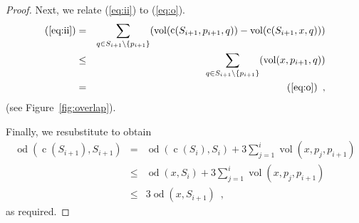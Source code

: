 \documentclass{article}
\DeclareMathOperator{\od}{od}
\DeclareMathOperator{\vol}{vol}
\DeclareMathOperator{\cog}{c}
\begin{document}
\begin{proof}
Next, we relate (\ref{eq:ii}) to (\ref{eq:o}).
\begin{eqnarray*}
 (\ref{eq:ii})  
     &=&  \sum_{q\in S_{i+1}\setminus \{p_{i+1}\}}
          (\vol(\cog(S_{i+1},p_{i+1},q)) - \vol(\cog(S_{i+1},x,q))) \\
     &\le &  \sum_{q\in S_{i+1}\setminus \{p_{i+1}\}} (\vol(x,p_{i+1},q)) \\
     & = &  (\ref{eq:o}) \enspace ,
\end{eqnarray*}
(see Figure~\ref{fig:overlap}).

Finally, we resubstitute to obtain
\begin{eqnarray*}
\od(\cog(S_{i+1}),S_{i+1}) 
  & = & \od(\cog(S_{i}),S_{i}) + 3 \sum_{j=1}^i \vol(x,p_j,p_{i+1}) \\
  &\le& \od(x,S_{i}) + 3 \sum_{j=1}^i \vol(x,p_j,p_{i+1}) \\
  &\le& 3\od(x,S_{i+1}) \enspace ,
\end{eqnarray*}
as required.
\end{proof}
\end{document}
